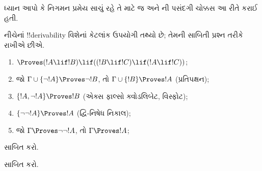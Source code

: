 \documentclass[../../../include/open-logic-section]{subfiles}
\begin{document}
ધ્યાન આપો કે નિગમન પ્રમેય સાચું રહે તે માટે જ
 અને ની પસંદગી ચોક્કસ આ રીતે
કરાઈ હતી.

નીચેનાં !!{derivability} વિશેનાં કેટલાંક ઉપયોગી તથ્યો છે; તેમની
સાબિતી પ્રશ્ન તરીકે રાખીએ છીએ.

\begin{prop}
\begin{enumerate}
\item $\Proves (!A \lif !B) \lif ((!B \lif !C)
  \lif (!A \lif !C))$; 
\item જો $\Gamma \cup \{ \lnot !A\}
  \Proves \lnot !B$, તો $\Gamma \cup \{ !B\} \Proves
  !A$ (પ્રતિપક્ષન); 
\item  $\{ !A, \lnot!A\} \Proves
    !B$ (એક્સ ફાલ્સો ક્વોડલિબેટ, વિસ્ફોટ); 
\item  $\{ \lnot\lnot!A\} \Proves
  !A$ (દ્વિ-નિષેધ નિકાલ);
\item જો $\Gamma \Proves \lnot\lnot!A$, તો $\Gamma \Proves
  !A$;
\end{enumerate}
\end{prop}


\begin{prob}
   સાબિત કરો.
\end{prob}
\tagendprob

\begin{prob}
   સાબિત કરો.
\end{prob}
\tagendprob
\end{document}
